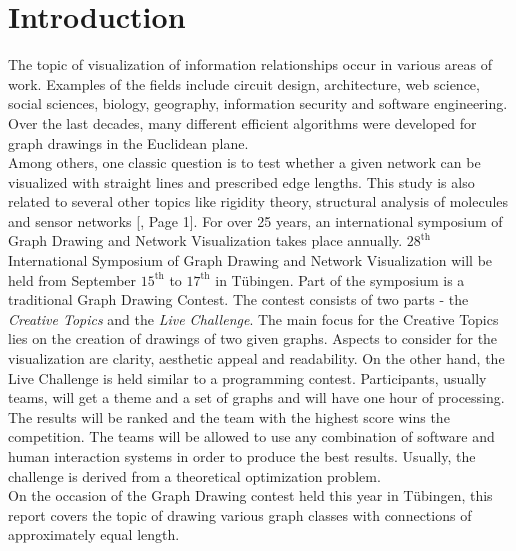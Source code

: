 \section{Introduction}
The topic of visualization of information relationships occur in various areas of work. Examples of the fields include circuit design, architecture, web science, social sciences, biology, geography, information security and software engineering. Over the last decades, many different efficient algorithms were developed for graph drawings in the Euclidean plane.\\
Among others, one classic question is to test whether a given network can be visualized with straight lines and prescribed edge lengths. This study is also related to several other topics like rigidity theory, structural analysis of molecules and sensor networks [\cite{DBLP:journals/corr/abs-2108-12628}, Page 1].
For over 25 years, an international symposium of Graph Drawing and Network Visualization takes place annually. $28^{\text{th}}$ International Symposium of Graph Drawing and Network Visualization will be held from September $15^{\text{th}}$ to $17^{\text{th}}$ in Tübingen. 
\newline Part of the symposium is a traditional Graph Drawing Contest. The contest consists of two parts - the \textit{Creative Topics} and the \textit{Live Challenge}. The main focus for the Creative Topics lies on the creation of drawings of two given graphs. Aspects to consider for the visualization are clarity, aesthetic appeal and readability.
\newline On the other hand, the Live Challenge is held similar to a programming contest. Participants, usually teams, will get a theme and a set of graphs and will have one hour of processing. The results will be ranked and the team with the highest score wins the competition. The teams will be allowed to use any combination of software and human interaction systems in order to produce the best results. Usually, the challenge is derived from a theoretical optimization problem.\bigskip\\
On the occasion of the Graph Drawing contest held this year in Tübingen, this report covers the topic of drawing various graph classes with connections of approximately equal length.

